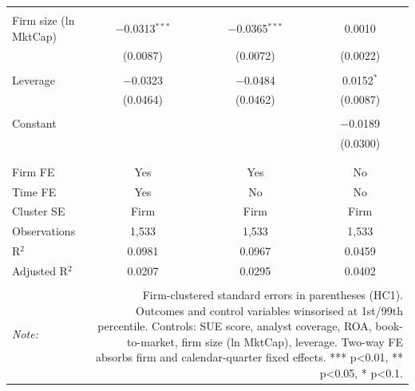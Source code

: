 \begin{table}[!htbp]
\begin{tabular}{@{\extracolsep{5pt}}lccc}
  & & & \\ 
 Firm size (ln MktCap) & $-$0.0313$^{***}$ & $-$0.0365$^{***}$ & 0.0010 \\ 
  & (0.0087) & (0.0072) & (0.0022) \\ 
  & & & \\ 
 Leverage & $-$0.0323 & $-$0.0484 & 0.0152$^{*}$ \\ 
  & (0.0464) & (0.0462) & (0.0087) \\ 
  & & & \\ 
 Constant &  &  & $-$0.0189 \\ 
  &  &  & (0.0300) \\ 
  & & & \\ 
\hline \\[-1.8ex] 
Firm FE & Yes & Yes & No \\ 
Time FE & Yes & No & No \\ 
Cluster SE & Firm & Firm & Firm \\ 
Observations & 1,533 & 1,533 & 1,533 \\ 
R$^{2}$ & 0.0981 & 0.0967 & 0.0459 \\ 
Adjusted R$^{2}$ & 0.0207 & 0.0295 & 0.0402 \\ 
\hline 
\hline \\[-1.8ex] 
\textit{Note:}  & \multicolumn{3}{r}{Firm-clustered standard errors in parentheses (HC1). Outcomes and control variables winsorised at 1st/99th percentile. Controls: SUE score, analyst coverage, ROA, book-to-market, firm size (ln MktCap), leverage. Two-way FE absorbs firm and calendar-quarter fixed effects. *** p<0.01, ** p<0.05, * p<0.1.} \\ 
\end{tabular} 
\end{table} 
